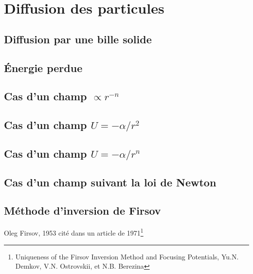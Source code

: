 \section{Diffusion des particules}

\subsection{Diffusion par une bille solide}

\subsection{\'Energie perdue}

\subsection{Cas d'un champ $\propto r^{-n}$}

\subsection{Cas d'un champ $U = -\alpha / r^{2}$}

\subsection{Cas d'un champ $U = -\alpha / r^{n}$}

\subsection{Cas d'un champ suivant la loi de Newton}

\subsection{M\'ethode d'inversion de Firsov}

Oleg Firsov, 1953 cit\'e dans un article de 1971\footnote{Uniqueness of the Firsov Inversion Method and Focusing Potentials, Yu.N. Demkov, V.N. Ostrovskii, et N.B. Berezina}